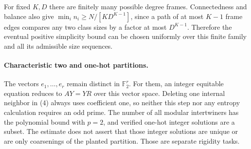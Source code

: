 \documentclass[11pt]{article}
\newcommand{\F}{\mathbb F}
\begin{document}
For fixed $K,D$ there are finitely many possible degree frames. Connectedness
and balance also give $\min_i n_i\geq N/[KD^{K-1}]$, since a path of at
most $K-1$ frame edges compares any two class sizes by a factor at most
$D^{K-1}$. Therefore the eventual positive simplicity bound can be chosen
uniformly over this finite family and all its admissible size sequences.

\paragraph{Characteristic two and one-hot partitions.}
The vectors $e_1,\ldots,e_r$ remain distinct in $\F_2^r$. For them,
an integer equitable equation reduces to $AY=YR$ over this vector space.
Deleting one internal neighbor in (4) always uses coefficient one, so
neither this step nor any entropy calculation requires an odd prime.
The number of all modular intertwiners has the polynomial bound with
$p=2$, and verified one-hot integer solutions are a subset. The estimate
does not assert that those integer solutions are unique or are only
coarsenings of the planted partition. Those are separate rigidity tasks.
\end{document}
